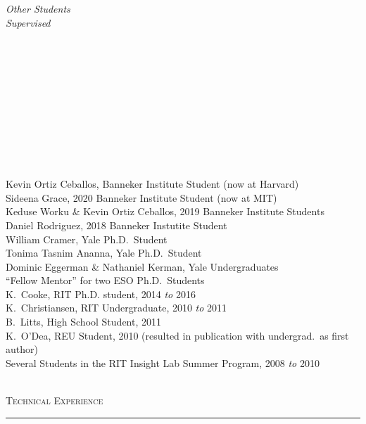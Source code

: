 \documentclass[11pt]{article}
\makeatletter
\def\vhrulefill#1{\leavevmode\leaders\hrule\@height#1\hfill \kern\z@}
\makeatother
\begin{document}
\vspace{4mm}


\hspace{2.5mm} \parbox{1.5in}{\textit{Other Students \\ Supervised \\\\\\\\\\\\\\\\\\\\\\}} \parbox{5.15in}{
Kevin Ortiz Ceballos, Banneker Institute Student (now at Harvard) \\
Sideena Grace, 2020 Banneker Institute Student (now at MIT) \\
Keduse Worku \& Kevin Ortiz Ceballos, 2019 Banneker Institute Students \\
Daniel Rodriguez, 2018 Banneker Instutite Student\\
William Cramer, Yale Ph.D.~Student\\
Tonima Tasnim Ananna, Yale Ph.D.~Student\\
Dominic Eggerman \& Nathaniel Kerman, Yale Undergraduates \\
``Fellow Mentor'' for two ESO Ph.D.~Students \\
K.~Cooke, RIT Ph.D. student, 2014 \textit{to} 2016 \\
K.~Christiansen, RIT Undergraduate, 2010 \textit{to} 2011 \\ B.~Litts, High School Student, 2011 \\ K.~O'Dea, REU Student, 2010 (resulted in publication with undergrad.~as first author)  \\  Several Students in the RIT Insight Lab Summer Program, 2008 \textit{to} 2010}\\






\textsc{Technical Experience} \vhrulefill{0.4pt}

\vspace{5mm}
\end{document}

